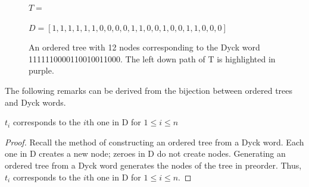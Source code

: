 \bigskip

\begin{figure}
    $T=$


    $D=[1, 1, 1, 1, 1, 1, 0, 0, 0, 0, 1, 1, 0, 0, 1, 0, 0, 1, 1, 0, 0, 0]$
    \caption{An ordered tree with 12 nodes corresponding to the Dyck word 1111110000110010011000.  The left down path of T is highlighted in purple. }
    \label{exampleotree}
\end{figure}

The following remarks can be derived from the bijection between ordered trees and Dyck words.


\begin{remark}
    $t_i$ corresponds to the $i$th one in D for $1 \le i \le n$
\end{remark}
\begin{proof}
    Recall the method of constructing an ordered tree from a Dyck word.  Each one in D creates a new node; zeroes in D do not create nodes.  Generating an ordered tree from a Dyck word generates the nodes of the tree in preorder.  Thus, $t_i$ corresponds to the $i$th one in D for $1 \le i \le n$.
\end{proof}

